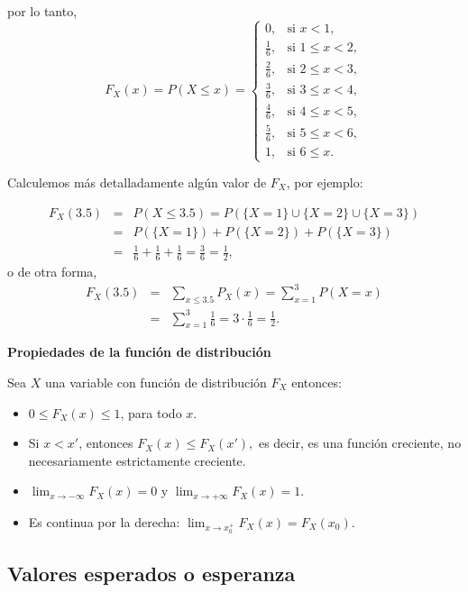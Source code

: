 \documentclass[
  letterpaper,
  DIV=11,
  numbers=noendperiod]{scrreprt}
\providecommand{\tightlist}{%
  \setlength{\itemsep}{0pt}\setlength{\parskip}{0pt}}\usepackage{longtable,booktabs,array}
\begin{document}
por lo tanto, \[F_{X}(x)=P(X\leq x)=\left\{\begin{array}{ll}
   0, & \mbox{si } x<1,\\[1ex]
   \frac16, &\mbox{si } 1\leq x<2,\\[1ex]
   \frac26, &\mbox{si } 2\leq x<3,\\[1ex]
   \frac36, &\mbox{si } 3\leq x<4,\\[1ex]
   \frac46, &\mbox{si } 4\leq x<5,\\[1ex]
   \frac56, &\mbox{si } 5\leq x<6,\\[1ex]
   1, &\mbox{si } 6\leq x.\end{array}\right.\]

Calculemos más detalladamente algún valor de \(F_{X}\), por ejemplo:

\begin{eqnarray*}
F_{X}(3.5) & = & P(X\leq 3.5)=  P(\{X=1\}\cup\{X=2\}\cup \{X=3\})\\
&=& P(\{X=1\})+P(\{X=2\})+P(\{X=3\})\\
&=& \frac16+\frac16+\frac16=\frac36 =\frac12,
\end{eqnarray*} o de otra forma, \begin{eqnarray*}
F_{X}(3.5)&=&\sum_{x\leq 3.5} P_X(x)=\sum_{x=1}^3 P(X=x)\\&=&\sum_{x=1}^3 \frac16= 3 \cdot
   \frac16=\frac12.
\end{eqnarray*}

\textbf{Propiedades de la función de distribución}

Sea \(X\) una variable con función de distribución \(F_{X}\) entonces:

\begin{itemize}
\tightlist
\item
  \(0\leq F_{X}(x)\leq 1\), para todo \(x\).
\item
  Si \(x<x'\), entonces \(F_{X}(x)\leq F_{X}(x'),\) es decir, es una
  función creciente, no necesariamente estrictamente creciente.
\item
  \(\displaystyle \lim_{x\to -\infty}F_{X}(x)=0\) y
  \(\displaystyle \lim_{x\to +\infty}F_{X}(x)=1\).
\item
  Es continua por la derecha:
  \(\displaystyle \lim_{x\to x_0^{+}}F_{X}(x)=F_{X}(x_0)\).
\end{itemize}

\hypertarget{valores-esperados-o-esperanza}{%
\subsection{Valores esperados o
esperanza}\label{valores-esperados-o-esperanza}}
\end{document}
